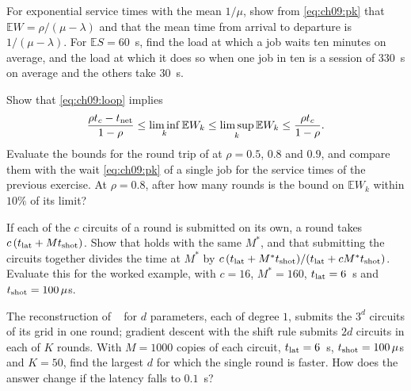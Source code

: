 \documentclass[handoutsbeamer.tex]{subfiles}
\begin{document}

\begin{frame}
\onp{\footnotesize}
\begin{exe}\label{exe:ch09:mm1}
For exponential service times with the mean $1/\mu$, show from \eqref{eq:ch09:pk} that $\mathbb E W = \rho/(\mu-\lambda)$ and that the mean time from arrival to departure is $1/(\mu-\lambda)$. For $\mathbb E S = 60$~s, find the load at which a job waits ten minutes on average, and the load at which it does so when one job in ten is a session of $330$~s on average and the others take $30$~s.
\end{exe}
\begin{exe}\label{exe:ch09:loop}
Show that \eqref{eq:ch09:loop} implies \[\frac{\rho t_c-t_{\rm net}}{1-\rho}\le\liminf_k\mathbb E W_k\le\limsup_k\mathbb E W_k\le\frac{\rho t_c}{1-\rho}.\] Evaluate the bounds for the round trip of  at $\rho = 0.5$, $0.8$ and $0.9$, and compare them with the wait \eqref{eq:ch09:pk} of a single job for the service times of the previous exercise. At $\rho = 0.8$, after how many rounds is the bound on $\mathbb E W_k$ within $10\%$ of its limit?
\end{exe}
\end{frame}

\begin{frame}
\onp{\footnotesize}
\begin{exe}\label{exe:ch09:batch}
If each of the $c$ circuits of a round is submitted on its own, a round takes $c\,(t_{\rm lat}+Mt_{\rm shot})$. Show that  holds with the same $M^*$, and that submitting the circuits together divides the time at $M^*$ by $c\,(t_{\rm lat}+M^*t_{\rm shot})/(t_{\rm lat}+cM^*t_{\rm shot})$. Evaluate this for the worked example, with $c = 16$, $M^* = 160$, $t_{\rm lat} = 6$~s and $t_{\rm shot} = 100\,\mu$s.
\end{exe}
\begin{exe}\label{exe:ch09:grid}
The reconstruction of \Chap~ for $d$ parameters, each of degree $1$, submits the $3^d$ circuits of its grid in one round; gradient descent with the shift rule submits $2d$ circuits in each of $K$ rounds. With $M = 1000$ copies of each circuit, $t_{\rm lat} = 6$~s, $t_{\rm shot} = 100\,\mu$s and $K = 50$, find the largest $d$ for which the single round is faster. How does the answer change if the latency falls to $0.1$~s?
\end{exe}
\end{frame}

\begin{frame}[allowframebreaks]
\biblio
\end{frame}
\end{document}
